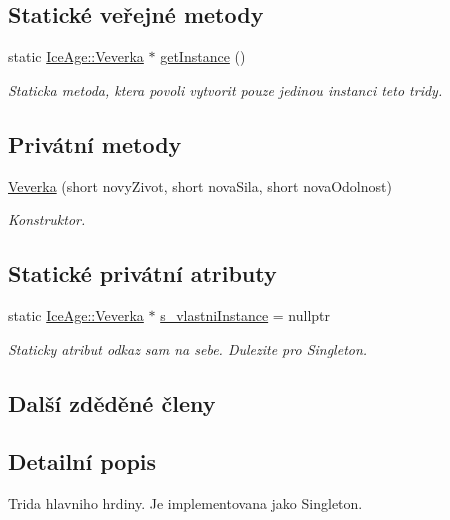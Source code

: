 \subsection*{Statické veřejné metody}
\begin{DoxyCompactItemize}
\item 
static \hyperlink{classIceAge_1_1Veverka}{Ice\+Age\+::\+Veverka} $\ast$ \hyperlink{classIceAge_1_1Veverka_a12909a7053332344e9b8c71845bb8e1f}{get\+Instance} ()
\begin{DoxyCompactList}\small\item\em Staticka metoda, ktera povoli vytvorit pouze jedinou instanci teto tridy. \end{DoxyCompactList}\end{DoxyCompactItemize}
\subsection*{Privátní metody}
\begin{DoxyCompactItemize}
\item 
\hyperlink{classIceAge_1_1Veverka_a527c1eeb2f4a165f65ade3852719ef68}{Veverka} (short novy\+Zivot, short nova\+Sila, short nova\+Odolnost)
\begin{DoxyCompactList}\small\item\em Konstruktor. \end{DoxyCompactList}\end{DoxyCompactItemize}
\subsection*{Statické privátní atributy}
\begin{DoxyCompactItemize}
\item 
static \hyperlink{classIceAge_1_1Veverka}{Ice\+Age\+::\+Veverka} $\ast$ \hyperlink{classIceAge_1_1Veverka_acfa9aa07c2cfa881fbcc6feeb717c287}{s\+\_\+vlastni\+Instance} = nullptr
\begin{DoxyCompactList}\small\item\em Staticky atribut odkaz sam na sebe. Dulezite pro Singleton. \end{DoxyCompactList}\end{DoxyCompactItemize}
\subsection*{Další zděděné členy}


\subsection{Detailní popis}
Trida hlavniho hrdiny. Je implementovana jako Singleton. 

